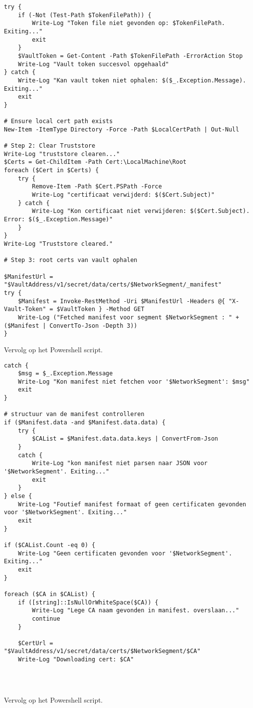 \begin{listing}[H]\ContinuedFloat
\begin{verbatim}
try {
    if (-Not (Test-Path $TokenFilePath)) {
        Write-Log "Token file niet gevonden op: $TokenFilePath. Exiting..."
        exit
    }
    $VaultToken = Get-Content -Path $TokenFilePath -ErrorAction Stop
    Write-Log "Vault token succesvol opgehaald"
} catch {
    Write-Log "Kan vault token niet ophalen: $($_.Exception.Message). Exiting..."
    exit
}

# Ensure local cert path exists
New-Item -ItemType Directory -Force -Path $LocalCertPath | Out-Null

# Step 2: Clear Truststore
Write-Log "truststore clearen..."
$Certs = Get-ChildItem -Path Cert:\LocalMachine\Root
foreach ($Cert in $Certs) {
    try {
        Remove-Item -Path $Cert.PSPath -Force
        Write-Log "certificaat verwijderd: $($Cert.Subject)"
    } catch {
        Write-Log "Kon certificaat niet verwijderen: $($Cert.Subject). Error: $($_.Exception.Message)"
    }
}
Write-Log "Truststore cleared."

# Step 3: root certs van vault ophalen

$ManifestUrl = "$VaultAddress/v1/secret/data/certs/$NetworkSegment/_manifest"
try {
    $Manifest = Invoke-RestMethod -Uri $ManifestUrl -Headers @{ "X-Vault-Token" = $VaultToken } -Method GET
    Write-Log ("Fetched manifest voor segment $NetworkSegment : " + ($Manifest | ConvertTo-Json -Depth 3))
}

\end{verbatim}
\caption[]{Vervolg op het Powershell script.}
\end{listing}

\begin{listing}[H]\ContinuedFloat
\begin{verbatim}
catch {
    $msg = $_.Exception.Message
    Write-Log "Kon manifest niet fetchen voor '$NetworkSegment': $msg"
    exit
}

# structuur van de manifest controlleren
if ($Manifest.data -and $Manifest.data.data) {
    try {
        $CAList = $Manifest.data.data.keys | ConvertFrom-Json
    }
    catch {
        Write-Log "kon manifest niet parsen naar JSON voor '$NetworkSegment'. Exiting..."
        exit
    }
} else {
    Write-Log "Foutief manifest formaat of geen certificaten gevonden voor '$NetworkSegment'. Exiting..."
    exit
}

if ($CAList.Count -eq 0) {
    Write-Log "Geen certificaten gevonden voor '$NetworkSegment'. Exiting..."
    exit
}

foreach ($CA in $CAList) {
    if ([string]::IsNullOrWhiteSpace($CA)) {
        Write-Log "Lege CA naam gevonden in manifest. overslaan..."
        continue
    }

    $CertUrl = "$VaultAddress/v1/secret/data/certs/$NetworkSegment/$CA"
    Write-Log "Downloading cert: $CA"


    

\end{verbatim}
\caption[]{Vervolg op het Powershell script.}
\end{listing}

